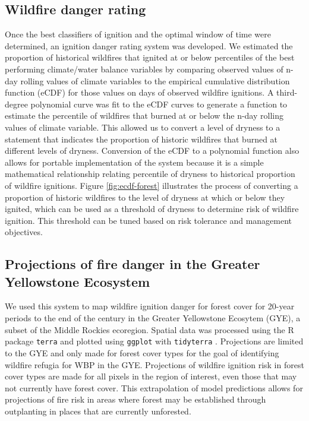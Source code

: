 \documentclass[11p]{article}
\begin{document}
\subsection{Wildfire danger rating}

Once the best classifiers of ignition and the optimal window of time were determined, an ignition danger rating system was developed. We estimated the proportion of historical wildfires that ignited at or below percentiles of the best performing climate/water balance variables by comparing observed values of n-day rolling values of climate variables to the empirical cumulative distribution function (eCDF) for those values on days of observed wildfire ignitions. A third-degree polynomial curve was fit to the eCDF curves to generate a function to estimate the percentile of wildfires that burned at or below the n-day rolling values of climate variable. This allowed us to convert a level of dryness to a statement that indicates the proportion of historic wildfires that burned at different levels of dryness. Conversion of the eCDF to a polynomial function also allows for portable implementation of the system because it is a simple mathematical relationship relating percentile of dryness to historical proportion of wildfire ignitions. Figure \ref{fig:ecdf-forest} illustrates the process of converting a proportion of historic wildfires to the level of dryness at which or below they ignited, which can be used as a threshold of dryness to determine risk of wildfire ignition. This threshold can be tuned based on risk tolerance and management objectives.

\subsection{Projections of fire danger in the Greater Yellowstone Ecosystem}

We used this system to map wildfire ignition danger for forest cover for 20-year periods to the end of the century in the Greater Yellowstone Ecosytem (GYE), a subset of the Middle Rockies ecoregion. Spatial data was processed using the R package \texttt{terra} \citep{hijmansTerraSpatialData2024} and plotted using \texttt{ggplot} \citep{wickhamGgplot2ElegantGraphics2016} with \texttt{tidyterra} \citep{hernangomezUsingTidyverseTerra2023}. Projections are limited to the GYE and only made for forest cover types for the goal of identifying wildfire refugia for WBP in the GYE. Projections of wildfire ignition risk in forest cover types are made for all pixels in the region of interest, even those that may not currently have forest cover. This extrapolation of model predictions allows for projections of fire risk in areas where forest may be established through outplanting in places that are currently unforested.
\end{document}
